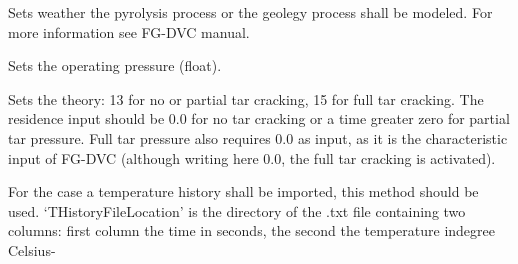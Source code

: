 \documentclass[letterpaper,10pt,english]{sphinxmanual}
\begin{document}
\begin{fulllineitems}

\begin{fulllineitems}
\label{FGDVCClasses:FGDVC_SetAndLaunch.SetterAndLauncher.set4RunID}
Sets weather the pyrolysis process or the geolegy process shall be modeled. For more information see FG-DVC manual.

\end{fulllineitems}


\begin{fulllineitems}
\label{FGDVCClasses:FGDVC_SetAndLaunch.SetterAndLauncher.set5Pressure}
Sets the operating pressure (float).

\end{fulllineitems}


\begin{fulllineitems}
\label{FGDVCClasses:FGDVC_SetAndLaunch.SetterAndLauncher.set6Theorie}
Sets the theory: 13 for no or partial tar cracking, 15 for full tar cracking. The residence input should be 0.0 for no tar cracking or a time greater zero for partial tar pressure. Full tar pressure also requires 0.0 as input, as it is the characteristic input of FG-DVC (although writing here 0.0, the full tar cracking is activated).

\end{fulllineitems}


\begin{fulllineitems}
\label{FGDVCClasses:FGDVC_SetAndLaunch.SetterAndLauncher.set7File}
For the case a temperature history shall be imported, this method should be used. `THistoryFileLocation' is the directory of the .txt file containing two columns: first column the time in seconds, the second the temperature indegree Celsius-

\end{fulllineitems}


\end{fulllineitems}
\end{document}
